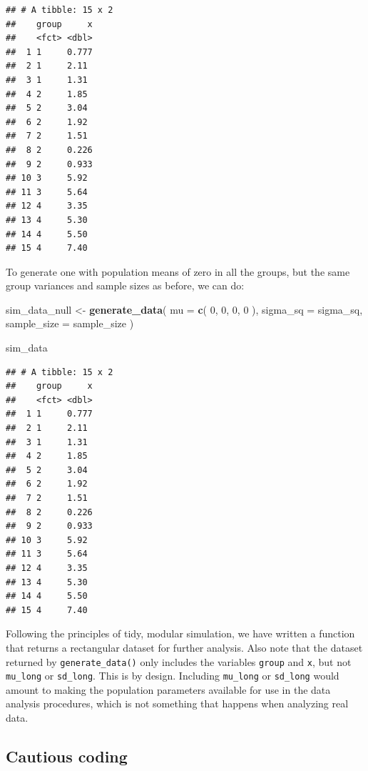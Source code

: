 \documentclass[
]{book}
\newenvironment{Shaded}{\begin{snugshade}}{\end{snugshade}}
\newcommand{\AttributeTok}[1]{\textcolor[rgb]{0.13,0.29,0.53}{#1}}
\newcommand{\DecValTok}[1]{\textcolor[rgb]{0.00,0.00,0.81}{#1}}
\newcommand{\FunctionTok}[1]{\textcolor[rgb]{0.13,0.29,0.53}{\textbf{#1}}}
\newcommand{\NormalTok}[1]{#1}
\newcommand{\OtherTok}[1]{\textcolor[rgb]{0.56,0.35,0.01}{#1}}
\begin{document}
\begin{verbatim}
## # A tibble: 15 x 2
##    group     x
##    <fct> <dbl>
##  1 1     0.777
##  2 1     2.11 
##  3 1     1.31 
##  4 2     1.85 
##  5 2     3.04 
##  6 2     1.92 
##  7 2     1.51 
##  8 2     0.226
##  9 2     0.933
## 10 3     5.92 
## 11 3     5.64 
## 12 4     3.35 
## 13 4     5.30 
## 14 4     5.50 
## 15 4     7.40
\end{verbatim}

To generate one with population means of zero in all the groups, but the same group variances and sample sizes as before, we can do:

\begin{Shaded}
\begin{Highlighting}[]
\NormalTok{sim\_data\_null }\OtherTok{\textless{}{-}} \FunctionTok{generate\_data}\NormalTok{(}
  \AttributeTok{mu =} \FunctionTok{c}\NormalTok{( }\DecValTok{0}\NormalTok{, }\DecValTok{0}\NormalTok{, }\DecValTok{0}\NormalTok{, }\DecValTok{0}\NormalTok{ ),}
  \AttributeTok{sigma\_sq =}\NormalTok{ sigma\_sq, }
  \AttributeTok{sample\_size =}\NormalTok{ sample\_size}
\NormalTok{)}

\NormalTok{sim\_data}
\end{Highlighting}
\end{Shaded}

\begin{verbatim}
## # A tibble: 15 x 2
##    group     x
##    <fct> <dbl>
##  1 1     0.777
##  2 1     2.11 
##  3 1     1.31 
##  4 2     1.85 
##  5 2     3.04 
##  6 2     1.92 
##  7 2     1.51 
##  8 2     0.226
##  9 2     0.933
## 10 3     5.92 
## 11 3     5.64 
## 12 4     3.35 
## 13 4     5.30 
## 14 4     5.50 
## 15 4     7.40
\end{verbatim}

Following the principles of tidy, modular simulation, we have written a function that returns a rectangular dataset for further analysis.
Also note that the dataset returned by \texttt{generate\_data()} only includes the variables \texttt{group} and \texttt{x}, but not \texttt{mu\_long} or \texttt{sd\_long}.
This is by design.
Including \texttt{mu\_long} or \texttt{sd\_long} would amount to making the population parameters available for use in the data analysis procedures, which is not something that happens when analyzing real data.

\subsection{Cautious coding}\label{cautious-coding}
\end{document}
